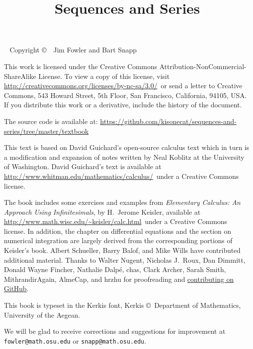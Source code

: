 \documentclass[justified]{tufte-book}
\title{Sequences and Series}
\begin{document}
\frontmatter

\maketitle

\pagebreak


\begin{fullwidth}
~\vfill
\thispagestyle{empty}
\setlength{\parindent}{0pt}
\setlength{\parskip}{\baselineskip}
Copyright \copyright\ \the\year\ Jim Fowler and Bart Snapp

This work is licensed under the Creative Commons
Attribution-NonCommercial-ShareAlike License. To view a copy of this
license, visit
\url{http://creativecommons.org/licenses/by-nc-sa/3.0/}~or send a
letter to Creative Commons, 543 Howard Street, 5th Floor, San
Francisco, California, 94105, USA. If you distribute this work or a
derivative, include the history of the document. 

The source code is available
at: \url{https://github.com/kisonecat/sequences-and-series/tree/master/textbook}

\noindent
This text is based on David Guichard's open-source calculus text which
in turn is a modification and expansion of notes written by Neal
Koblitz at the University of Washington. David Guichard's text is
available at \url{http://www.whitman.edu/mathematics/calculus/}~under a Creative Commons license.

\noindent The book includes some exercises and examples from {\it
  Elementary Calculus: An Approach Using Infinitesimals}, by H.~Jerome
Keisler, available at
\url{http://www.math.wisc.edu/~keisler/calc.html}~under a Creative
Commons license. In addition, the chapter on differential equations
and the section on numerical integration are largely derived from the
corresponding portions of Keisler's book.  Albert Schueller, Barry
Balof, and Mike Wills have contributed additional material.  Thanks to
Walter Nugent, Nicholas J.~Roux, Dan Dimmitt, Donald Wayne Fincher, Nathalie
Dalp\'e, chas, Clark Archer, Sarah Smith, MithrandirAgain, AlmeCap,
and hrzhu for proofreading and
\href{https://github.com/kisonecat/sequences-and-series/graphs/contributors}{contributing
  on GitHub}.

\noindent This book is typeset in the Kerkis font, 
Kerkis \copyright~Department of Mathematics, University of the Aegean.


\noindent We will be glad to receive corrections and suggestions for
improvement at \texttt{fowler@math.osu.edu} or
\texttt{snapp@math.osu.edu}.

\end{fullwidth}
\end{document}
